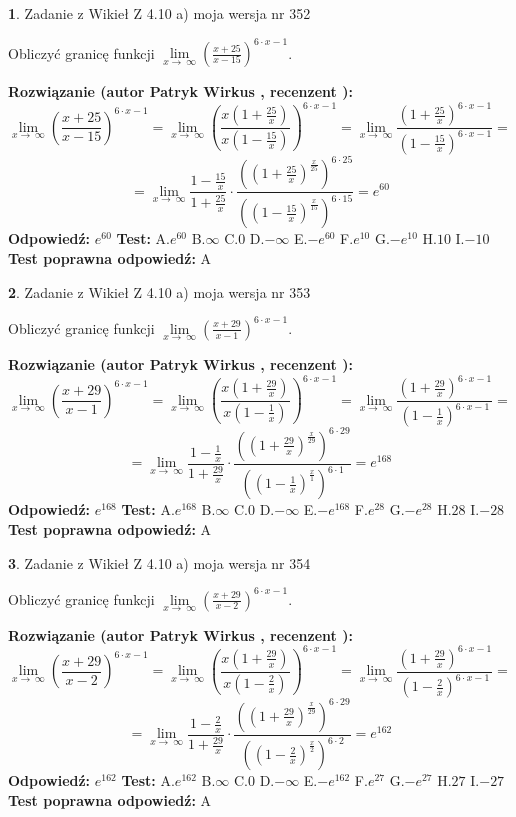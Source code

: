 \documentclass[12pt, a4paper]{article}
\theoremstyle{definition} %
\newtheorem{zad}{}
\newcommand{\zadStart}[1]{\begin{zad}#1\newline}
\newcommand{\zadStop}{\end{zad}}
\newcommand{\rozwStart}[2]{\noindent \textbf{Rozwiązanie (autor #1 , recenzent #2): }\newline}
\newcommand{\rozwStop}{\newline}
\newcommand{\odpStart}{\noindent \textbf{Odpowiedź:}\newline}
\newcommand{\odpStop}{\newline}
\newcommand{\testStart}{\noindent \textbf{Test:}\newline}
\newcommand{\testStop}{\newline}
\newcommand{\kluczStart}{\noindent \textbf{Test poprawna odpowiedź:}\newline}
\newcommand{\kluczStop}{\newline}
\begin{document}
\zadStart{Zadanie z Wikieł Z 4.10 a) moja wersja nr 352}

Obliczyć granicę funkcji  $\lim\limits_{x\to\ \infty}(\frac{x+25}{x-15})^{6\cdot x-1}$.
\zadStop
\rozwStart{Patryk Wirkus}{}
$$\lim\limits_{x\to\ \infty}(\frac{x+25}{x-15})^{6\cdot x-1} = \lim\limits_{x\to\ \infty}(\frac{x(1+\frac{25}{x})}{x(1-\frac{15}{x})})^{6\cdot x-1}=\lim\limits_{x\to\ \infty}\frac{(1+\frac{25}{x})^{6\cdot x-1}}{(1-\frac{15}{x})^{6\cdot x-1}}=$$
$$=\lim\limits_{x\to\ \infty}\frac{1-\frac{15}{x}}{1+\frac{25}{x}}\cdot\frac{((1+\frac{25}{x})^{\frac{x}{25}})^{6\cdot25}}{((1-\frac{15}{x})^{\frac{x}{15}})^{6\cdot15}}=e^{60}$$
\rozwStop
\odpStart
$e^{60}$
\odpStop
\testStart
A.$e^{60}$ B.$\infty$ C.$0$ D.$-\infty$ E.$-e^{60}$
F.$e^{10}$ G.$-e^{10}$
H.$10$
I.$-10$
\testStop
\kluczStart
A
\kluczStop



\zadStart{Zadanie z Wikieł Z 4.10 a) moja wersja nr 353}

Obliczyć granicę funkcji  $\lim\limits_{x\to\ \infty}(\frac{x+29}{x-1})^{6\cdot x-1}$.
\zadStop
\rozwStart{Patryk Wirkus}{}
$$\lim\limits_{x\to\ \infty}(\frac{x+29}{x-1})^{6\cdot x-1} = \lim\limits_{x\to\ \infty}(\frac{x(1+\frac{29}{x})}{x(1-\frac{1}{x})})^{6\cdot x-1}=\lim\limits_{x\to\ \infty}\frac{(1+\frac{29}{x})^{6\cdot x-1}}{(1-\frac{1}{x})^{6\cdot x-1}}=$$
$$=\lim\limits_{x\to\ \infty}\frac{1-\frac{1}{x}}{1+\frac{29}{x}}\cdot\frac{((1+\frac{29}{x})^{\frac{x}{29}})^{6\cdot29}}{((1-\frac{1}{x})^{\frac{x}{1}})^{6\cdot1}}=e^{168}$$
\rozwStop
\odpStart
$e^{168}$
\odpStop
\testStart
A.$e^{168}$ B.$\infty$ C.$0$ D.$-\infty$ E.$-e^{168}$
F.$e^{28}$ G.$-e^{28}$
H.$28$
I.$-28$
\testStop
\kluczStart
A
\kluczStop



\zadStart{Zadanie z Wikieł Z 4.10 a) moja wersja nr 354}

Obliczyć granicę funkcji  $\lim\limits_{x\to\ \infty}(\frac{x+29}{x-2})^{6\cdot x-1}$.
\zadStop
\rozwStart{Patryk Wirkus}{}
$$\lim\limits_{x\to\ \infty}(\frac{x+29}{x-2})^{6\cdot x-1} = \lim\limits_{x\to\ \infty}(\frac{x(1+\frac{29}{x})}{x(1-\frac{2}{x})})^{6\cdot x-1}=\lim\limits_{x\to\ \infty}\frac{(1+\frac{29}{x})^{6\cdot x-1}}{(1-\frac{2}{x})^{6\cdot x-1}}=$$
$$=\lim\limits_{x\to\ \infty}\frac{1-\frac{2}{x}}{1+\frac{29}{x}}\cdot\frac{((1+\frac{29}{x})^{\frac{x}{29}})^{6\cdot29}}{((1-\frac{2}{x})^{\frac{x}{2}})^{6\cdot2}}=e^{162}$$
\rozwStop
\odpStart
$e^{162}$
\odpStop
\testStart
A.$e^{162}$ B.$\infty$ C.$0$ D.$-\infty$ E.$-e^{162}$
F.$e^{27}$ G.$-e^{27}$
H.$27$
I.$-27$
\testStop
\kluczStart
A
\kluczStop
\end{document}
